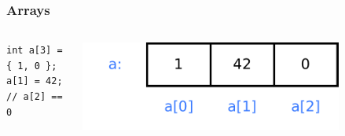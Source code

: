 \begin{frame}[fragile]
\frametitle{Arrays}
\begin{columns}[c]
  \begin{column}{0.5\textwidth}
\lstset{language=C++,numbers=left}
\begin{lstlisting}
int a[3] = { 1, 0 };
a[1] = 42;
// a[2] == 0
\end{lstlisting}
  \end{column}
  \begin{column}{0.5\textwidth}
    \includegraphics[width=0.8\textwidth]{figures/array0}
  \end{column}
\end{columns}
\end{frame}

